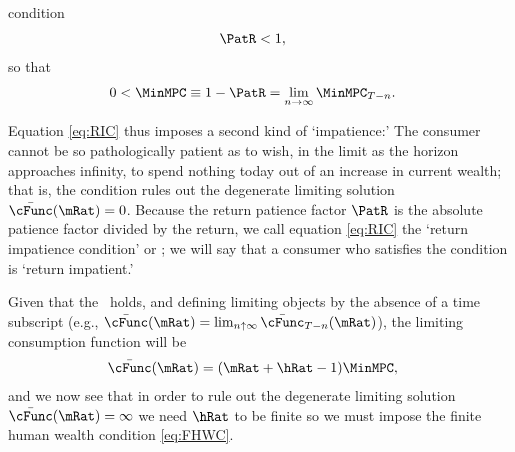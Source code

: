 \documentclass[./BufferStockTheory.tex]{subfiles}
\begin{document}
condition \hypertarget{RIC}{}
\begin{equation}\begin{gathered}\begin{aligned}
\PatR  & < 1   \label{eq:RIC},
\end{aligned}\end{gathered}\end{equation}
so that
\begin{equation}\begin{gathered}\begin{aligned}
   0 <  \MinMPC  & \equiv   1-\PatR = \lim_{n \rightarrow \infty} \MinMPC_{T-n} \label{eq:MinMPCDef}
.
\end{aligned}\end{gathered}\end{equation}

Equation \eqref{eq:RIC} thus imposes a second kind of `impatience:' The consumer cannot be so pathologically patient as to wish, in the limit as the horizon approaches infinity, to spend nothing today out of an increase in current wealth; that is, the condition rules out the degenerate limiting solution $\bar{\cFunc}(\mRat)=0$.  Because the return patience factor $\PatR$ is the absolute patience factor divided by the return, we call equation \eqref{eq:RIC} the `return impatience condition' or \RIC; we will say that a consumer who satisfies the condition is `return impatient.'

Given that the \RIC~holds, and defining limiting objects by the absence of a time subscript (e.g., $\bar{\cFunc}(\mRat)=\lim_{n \uparrow \infty} \bar{\cFunc}_{T-n}(\mRat)$), the limiting consumption function will be
\begin{equation}\begin{gathered}\begin{aligned}\label{eq:cFuncPFUnc}
  \bar{\cFunc}(\mRat)  & = (\mRat+\hRat-1)\MinMPC, 
\end{aligned}\end{gathered}\end{equation}
and we now see that in order to rule out the degenerate limiting
solution $\bar{\cFunc}(\mRat) = \infty$ we need $\hRat$ to be finite so we
must impose the finite human wealth condition \eqref{eq:FHWC}.
\end{document}
